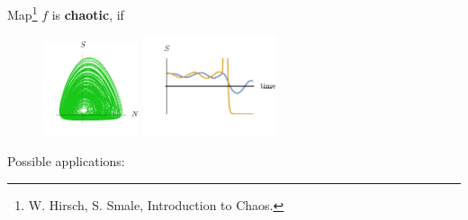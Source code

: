 
  Map\footnote{
    W. Hirsch, S. Smale, Introduction to Chaos.
} $f$ is \textbf{chaotic}, if \\
\begin{itemize}
\end{itemize}

\vspace{-5mm}
\begin{figure}[h]
    \centering
    \includegraphics[width=0.25\textwidth]{figures/attractor.pdf}
    \hspace{5 mm}
    \includegraphics[width=0.35\textwidth]{figures/ics.pdf}
\end{figure}

\vspace{-5mm}
\begin{minipage}{0.35\textwidth}
      Possible applications:
\end{minipage}
\hfill
\begin{minipage}{0.63\textwidth}
    \begin{itemize}
    \end{itemize}
\end{minipage}


